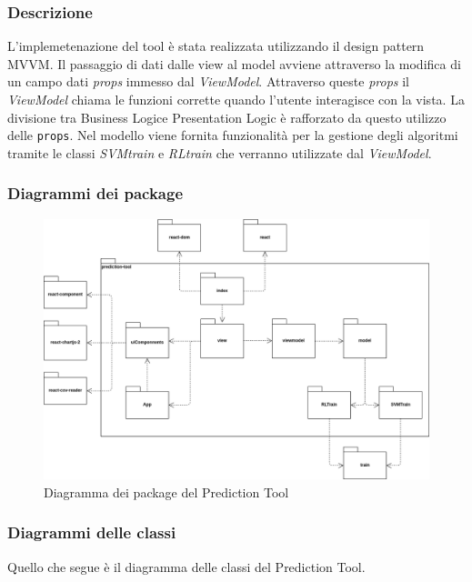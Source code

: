 \subsubsection{Descrizione}
L'implemetenazione del tool è stata realizzata utilizzando il design pattern MVVM.
Il passaggio di dati dalle view al model avviene attraverso la modifica di un campo dati \textit{props} immesso dal \textit{ViewModel}.
Attraverso queste \textit{props} il \textit{ViewModel} chiama le funzioni corrette quando l’utente interagisce con la vista.
La divisione tra Business Logic\glo e Presentation Logic è rafforzato da questo utilizzo delle \texttt{props}.
Nel modello viene fornita funzionalità per la gestione degli algoritmi tramite le classi \textit{SVMtrain} e \textit{RLtrain} che verranno utilizzate dal \textit{ViewModel}.

\subsubsection{Diagrammi dei package}
\begin{figure}[H]
\centering
\includegraphics[scale=0.4]{../../Diagrams/Package_diagrams/tool_design_patern.png}
\caption{Diagramma dei package del Prediction Tool}
\end{figure}

\subsubsection{Diagrammi delle classi}
Quello che segue è il diagramma delle classi del Prediction Tool.

